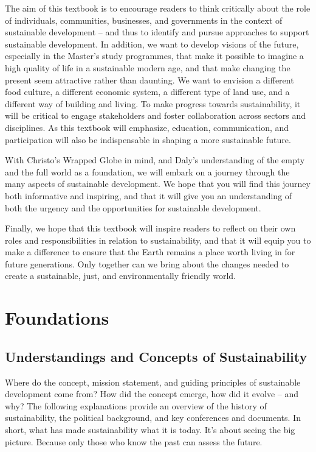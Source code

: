 \documentclass[
  a4paper,
  DIV=11,
  numbers=noendperiod,
  oneside,
  openany]{scrreprt}
\begin{document}
The aim of this textbook is to encourage readers to think critically
about the role of individuals, communities, businesses, and governments
in the context of sustainable development -- and thus to identify and
pursue approaches to support sustainable development. In addition, we
want to develop visions of the future, especially in the Master's study
programmes, that make it possible to imagine a high quality of life in a
sustainable modern age, and that make changing the present seem
attractive rather than daunting. We want to envision a different food
culture, a different economic system, a different type of land use, and
a different way of building and living. To make progress towards
sustainability, it will be critical to engage stakeholders and foster
collaboration across sectors and disciplines. As this textbook will
emphasize, education, communication, and participation will also be
indispensable in shaping a more sustainable future.

With Christo's Wrapped Globe in mind, and Daly's understanding of the
empty and the full world as a foundation, we will embark on a journey
through the many aspects of sustainable development. We hope that you
will find this journey both informative and inspiring, and that it will
give you an understanding of both the urgency and the opportunities for
sustainable development.

Finally, we hope that this textbook will inspire readers to reflect on
their own roles and responsibilities in relation to sustainability, and
that it will equip you to make a difference to ensure that the Earth
remains a place worth living in for future generations. Only together
can we bring about the changes needed to create a sustainable, just, and
environmentally friendly world.

\part{Foundations}

\chapter{Understandings and Concepts of
Sustainability}\label{understandings-and-concepts-of-sustainability}

Where do the concept, mission statement, and guiding principles of
sustainable development come from? How did the concept emerge, how did
it evolve -- and why? The following explanations provide an overview of
the history of sustainability, the political background, and key
conferences and documents. In short, what has made sustainability what
it is today. It's about seeing the big picture. Because only those who
know the past can assess the future.
\end{document}
